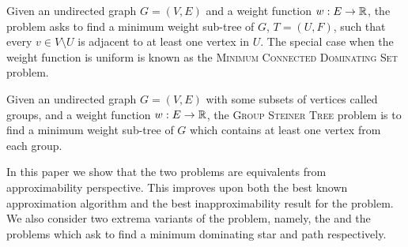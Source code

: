 Given an undirected graph $G = (V, E)$ and a weight function $w:E \to \mathbb{R}$, 
the \Problem{} problem asks to find a minimum weight sub-tree of $G$, 
$T = (U, F)$, such that every $v \in V \setminus U$ is adjacent to at least one 
vertex in $U$.
The special case when the weight function is uniform is known as the 
\textsc{Minimum Connected Dominating Set} problem.

Given an undirected graph $G = (V, E)$ with some subsets of vertices called groups,
and a weight function $w:E \to \mathbb{R}$,
the \textsc{Group Steiner Tree} problem is to find a minimum weight sub-tree
of $G$ which contains at least one vertex from each group. 

In this paper we show that the two problems are equivalents 
from approximability perspective.
This improves upon both the best known approximation algorithm and the best 
inapproximability result for the \Problem{} problem.
We also consider two extrema variants of the \Problem{} problem, namely,
the \ProblemStar{} and the \ProblemPath{} problems 
which ask to find a minimum dominating star and path respectively.  
